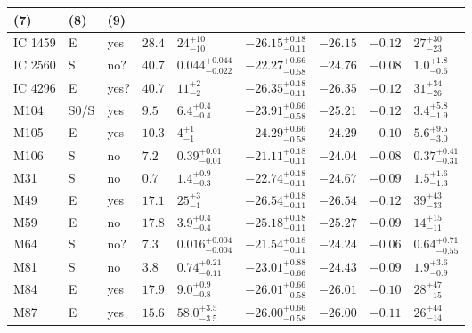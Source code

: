 \begin{table*}
\begin{center}
\begin{tabular}{lllllllll}
\multicolumn{1}{l}{(7)} &                             
\multicolumn{1}{l}{(8)} &                             
\multicolumn{1}{l}{(9)} \\                         
\hline                                                
IC 1459  &  E  &  yes   &  $28.4$  &  $24_{-10}^{+10}$   &  $-26.15_{-0.11}^{+0.18}$   &  $-26.15$   &  $-0.12$  &  $27_{-23}^{+30}$   \\ 
IC 2560  &  S  &  no?  &  $40.7$  &  $0.044_{-0.022}^{+0.044}$   &  $-22.27_{-0.58}^{+0.66}$   &  $-24.76$   &  $-0.08$  &  $1.0_{-0.6}^{+1.8}$   \\ 
IC 4296  &  E  &  yes?  &  $40.7$  &  $11_{-2}^{+2}$   &  $-26.35_{-0.11}^{+0.18}$   &  $-26.35$   &  $-0.12$  &  $31_{-26}^{+34}$   \\ 
M104  &  S0/S  &  yes   &  $9.5$  &  $6.4_{-0.4}^{+0.4}$   &  $-23.91_{-0.58}^{+0.66}$   &  $-25.21$   &  $-0.12$  &  $3.4_{-1.9}^{+5.8}$   \\ 
M105  &  E  &  yes   &  $10.3$  &  $4_{-1}^{+1}$   &  $-24.29_{-0.58}^{+0.66}$   &  $-24.29$   &  $-0.10$  &  $5.6_{-3.0}^{+9.5}$   \\ 
M106  &  S  &  no   &  $7.2$  &  $0.39_{-0.01}^{+0.01}$   &  $-21.11_{-0.11}^{+0.18}$   &  $-24.04$   &  $-0.08$  &  $0.37_{-0.31}^{+0.41}$   \\ 
M31  &  S  &  no   &  $0.7$  &  $1.4_{-0.3}^{+0.9}$   &  $-22.74_{-0.11}^{+0.18}$   &  $-24.67$   &  $-0.09$  &  $1.5_{-1.3}^{+1.6}$   \\ 
M49  &  E  &  yes   &  $17.1$  &  $25_{-1}^{+3}$   &  $-26.54_{-0.11}^{+0.18}$   &  $-26.54$   &  $-0.12$  &  $39_{-33}^{+43}$   \\ 
M59  &  E  &  no   &  $17.8$  &  $3.9_{-0.4}^{+0.4}$   &  $-25.18_{-0.11}^{+0.18}$   &  $-25.27$   &  $-0.09$  &  $14_{-11}^{+15}$   \\ 
M64  &  S  &  no?  &  $7.3$  &  $0.016_{-0.004}^{+0.004}$   &  $-21.54_{-0.11}^{+0.18}$   &  $-24.24$   &  $-0.06$  &  $0.64_{-0.55}^{+0.71}$   \\ 
M81  &  S  &  no   &  $3.8$  &  $0.74_{-0.11}^{+0.21}$   &  $-23.01_{-0.66}^{+0.88}$   &  $-24.43$   &  $-0.09$  &  $1.9_{-0.9}^{+3.6}$   \\ 
M84  &  E  &  yes   &  $17.9$  &  $9.0_{-0.8}^{+0.9}$   &  $-26.01_{-0.58}^{+0.66}$   &  $-26.01$   &  $-0.10$  &  $28_{-15}^{+47}$   \\ 
M87  &  E  &  yes   &  $15.6$  &  $58.0_{-3.5}^{+3.5}$   &  $-26.00_{-0.58}^{+0.66}$   &  $-26.00$   &  $-0.11$  &  $26_{-14}^{+44}$   \\ 

\end{tabular}
\end{center}
\end{table*}

